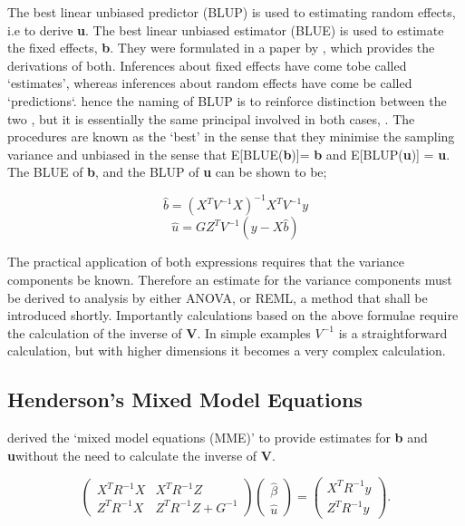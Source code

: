 \documentclass[12pt, a4paper]{report}
\begin{document}
The best linear unbiased predictor (BLUP) is used to estimating
random effects, i.e to derive \textbf{u}. The best linear unbiased
estimator (BLUE) is used to estimate the fixed effects,
\textbf{b}. They were formulated in a paper by \cite{Henderson59},
which provides the derivations of both. Inferences about fixed
effects have come tobe called `estimates', whereas inferences
about random effects have come be called `predictions`. hence the
naming of BLUP is to reinforce distinction between the two , but
it is essentially the same principal involved in both cases,
\citep{Robinson}. The procedures are known as the `best' in the
sense that they minimise the sampling variance and unbiased in the
sense that E[BLUE(\textbf{b})]= \textbf{b} and E[BLUP(\textbf{u})]
= \textbf{u}. The BLUE of \textbf{b}, and the BLUP of \textbf{u}
can be shown to be;

\begin{equation}
\hat{b} = (X^{T}V^{-1}X)^{-1}X^{T}V^{-1}y
\end{equation}
\begin{equation}
\hat{u} = GZ^{T}V^{-1}(y-X\hat{b})
\end{equation}

The practical application of both expressions requires that the
variance components be known. Therefore an estimate for the
variance components must be derived to analysis by either ANOVA,
or REML, a method that shall be introduced shortly. Importantly
calculations based on the above formulae require the calculation
of the inverse of \textbf{V}. In simple examples $V^{-1}$ is a
straightforward calculation, but with higher dimensions it becomes
a very complex calculation.



\subsection{Henderson's Mixed Model Equations}
\citet{Henderson50, Henderson63, Henderson73, Henderson84a}
derived the `mixed model equations (MME)' to provide estimates for
\textbf{b} and \textbf{u}without the need to calculate the inverse
of \textbf{V}.

\begin{equation}
\left(\begin{matrix}
X^{T}R^{-1}X  & X^{T}R^{-1}Z \\
Z^{T}R^{-1}X  & Z^{T}R^{-1}Z + G^{-1}
\end{matrix}\right) \left(\begin{array}{c}
\hat{\beta}  \\
\hat{u}\end{array} \right) = \left(  \begin{array}{c}
X^{T}R^{-1}y  \\
Z^{T}R^{-1}y  \end{array} \right).
\end{equation}
\end{document}
